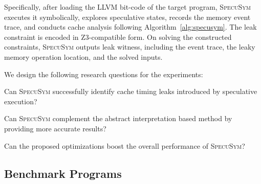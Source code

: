 \documentclass[sigconf]{acmart}
\newcommand{\SpecuSym}{\textsc{SpecuSym} }
\begin{document}
Specifically, after loading the LLVM bit-code of the target program, \SpecuSym 
executes it symbolically, explores speculative states, records the memory 
event trace, and conducts cache analysis following Algorithm~\ref{alg:specusym}. 
The leak constraint is encoded in Z3-compatible form. On solving the constructed 
constraints, \SpecuSym outputs leak witness, including the event trace, the leaky 
memory operation location, and the solved inputs. 


We design the following research questions for the experiments: 
\begin{itemize*}
\item Can \SpecuSym successfully identify cache timing leaks introduced 
by speculative execution?
\item Can \SpecuSym complement the abstract interpretation based method 
by providing more accurate results?
\item Can the proposed optimizations boost the overall performance of \textsc{SpecuSym}?
\end{itemize*}


\subsection{Benchmark Programs}
\label{sec:benchs}
\end{document}
